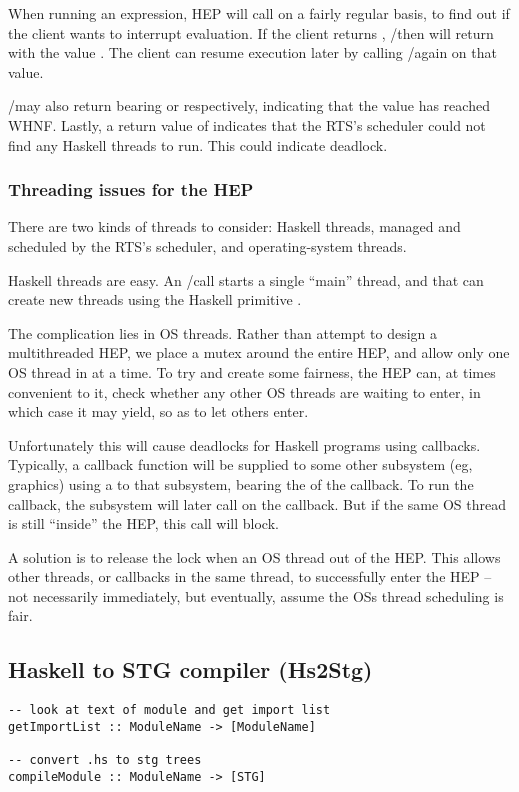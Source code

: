 When running an expression, HEP will call \verb@continue@ on a
fairly regular basis, to find out if the client wants to interrupt
evaluation.  If the client returns \verb@True@,
\verb@eval@/\verb@evalIO@ then will return with the value
\verb@YouAskedMeToStop@.  The client can resume execution later
by calling \verb@eval@/\verb@evalIO@ again on that value.

\verb@eval@/\verb@evalIO@ may also return bearing \verb@Done@
or \verb@DoneIO@ respectively, indicating that the value has
reached WHNF.  Lastly, a return value of \verb@NoThreadsToRun@
indicates that the RTS's scheduler could not find any Haskell
threads to run.  This could indicate deadlock.

\subsubsection{Threading issues for the HEP}
There are two kinds of threads to consider: Haskell threads,
managed and scheduled by the RTS's scheduler, and operating-system
threads.

Haskell threads are easy.  An \verb@eval@/\verb@evalIO@ call
starts a single ``main'' thread, and that can create new
threads using the Haskell primitive \verb@forkIO@.

The complication lies in OS threads.  Rather than attempt
to design a multithreaded HEP, we place a mutex around the
entire HEP, and allow only one OS thread in at a time.
To try and create some fairness, the HEP can, at times convenient
to it, check whether any other OS threads are waiting to enter,
in which case it may yield, so as to let others enter.

Unfortunately this will cause deadlocks for Haskell programs
using callbacks.  Typically, a callback function will be 
supplied to some other subsystem (eg, graphics) using a 
\verb@ccall@ to that subsystem, bearing the \verb@HsVal@ of the
callback.  To run the callback, the subsystem will later
call \verb@eval@ on the callback.  But if the same OS thread is
still ``inside'' the HEP, this call will block.

A solution is to release the lock when an OS thread \verb@ccall@s 
out of the HEP.  This allows other threads, or callbacks in the
same thread, to successfully enter the HEP -- not necessarily 
immediately, but eventually, assume the OSs thread scheduling
is fair.


\subsection{Haskell to STG compiler (Hs2Stg)}
\begin{verbatim}
-- look at text of module and get import list
getImportList :: ModuleName -> [ModuleName]

-- convert .hs to stg trees
compileModule :: ModuleName -> [STG]
\end{verbatim}



